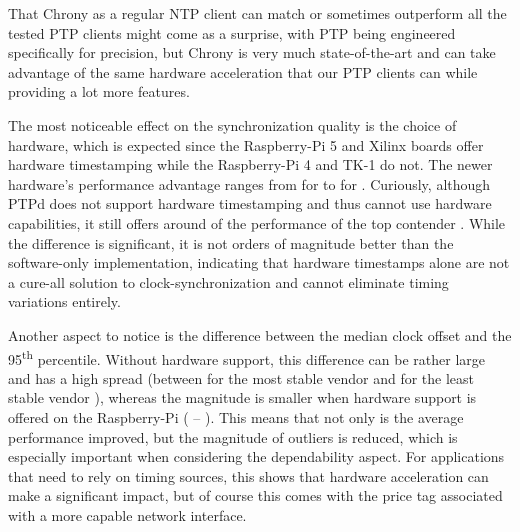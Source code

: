 %
That Chrony as a regular NTP client can match or sometimes outperform all the tested PTP clients might come as a surprise, with PTP being engineered specifically for precision, but Chrony is very much state-of-the-art and can take advantage of the same hardware acceleration that our PTP clients can while providing a lot more features.


The most noticeable effect on the synchronization quality is the choice of hardware, which is expected since the Raspberry-Pi 5 and Xilinx boards offer hardware timestamping while the Raspberry-Pi 4 and TK-1 do not. The newer hardware's performance advantage ranges from \fRatio{\cmpMin} for \fVendor{\cmpMinArg} to \fRatio{\cmpMax} for \fVendor{\cmpMaxArg}. Curiously, although PTPd does not support hardware timestamping and thus cannot use hardware capabilities, it still offers around  of the performance of the top contender . While the difference is significant, it is not orders of magnitude better than the software-only implementation, indicating that hardware timestamps alone are not a cure-all solution to clock-synchronization and cannot eliminate timing variations entirely.


%
Another aspect to notice is the difference between the median clock offset and the 95\textsuperscript{th} percentile. Without hardware support, this difference can be rather large and has a high spread (between \fRatio{\cmpMin} for the most stable vendor \fVendor{\cmpMinArg} and \fRatio{\cmpMax} for the least stable vendor \fVendor{\cmpMaxArg}),
whereas the magnitude is smaller when hardware support is offered on the Raspberry-Pi %
%
(\fRatio[1]{\cmpMin} \fVendor{\cmpMinArg} -- \fRatio[1]{\cmpMax} \fVendor{\cmpMaxArg}).
This means that not only is the average performance improved, but the magnitude of outliers is reduced, which is especially important when considering the dependability aspect. For applications that need to rely on timing sources, this shows that hardware acceleration can make a significant impact, but of course this comes with the price tag associated with a more capable network interface.

